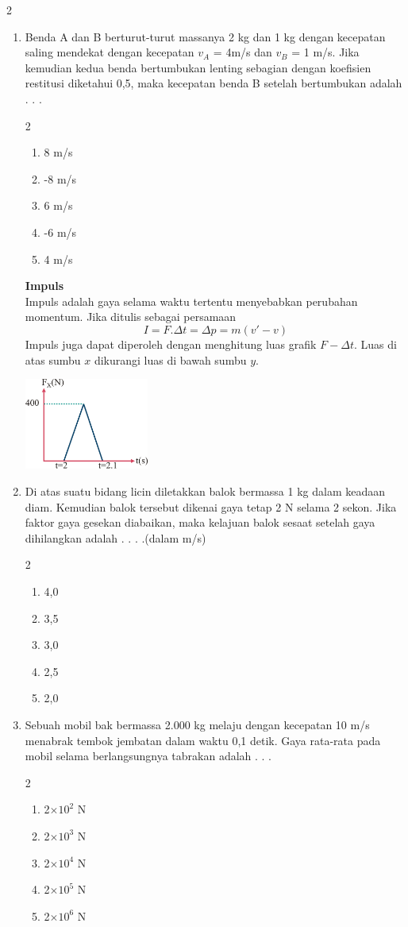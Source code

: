 \documentclass[10pt,a4paper]{extarticle}
\newcommand{\pilgani}[1]{                            \vspace{-0.3cm}\begin{multicols}{2}
 \begin{enumerate}[label=\Alph*., itemsep=0pt,topsep=0pt,leftmargin=*,align=Center]#1                     \end{enumerate}
 \phantom{ini cuma sapi, wedus, dan ayam}
 \end{multicols}}
\begin{document}
\begin{multicols*}{2}
\begin{enumerate}
\vspace{4cm}

\item Benda A dan B berturut-turut massanya 2 kg dan 1 kg dengan kecepatan saling mendekat dengan kecepatan $v_A$ = 4m/s dan $v_B$ = 1 m/s. Jika kemudian kedua benda bertumbukan lenting sebagian dengan koefisien restitusi diketahui 0,5, maka kecepatan benda B setelah bertumbukan adalah . . .
\pilgani{
        \item 8 m/s
        \item -8 m/s
        \item 6 m/s
        \item -6 m/s
        \item 4 m/s
        }
\vspace{4cm}




\textbf{ Impuls }\\
Impuls adalah gaya selama waktu tertentu menyebabkan perubahan momentum. Jika ditulis sebagai persamaan
$$ I = F.\Delta t = \Delta p = m(v'-v)$$
Impuls juga dapat diperoleh dengan menghitung luas grafik $F-\Delta t$. Luas di atas sumbu $x$ dikurangi luas di bawah sumbu $y$.
\begin{center}
\includegraphics[height=3cm]{pic/impuls}
\end{center}
\item Di atas suatu bidang licin diletakkan balok bermassa 1 kg dalam keadaan diam. Kemudian balok tersebut dikenai gaya tetap 2 N selama 2 sekon. Jika faktor gaya gesekan diabaikan, maka kelajuan balok sesaat setelah gaya dihilangkan adalah . . . .(dalam m/s)
\pilgani{
        \item 4,0
        \item 3,5
        \item 3,0
        \item 2,5
        \item 2,0}

\vspace{2cm}


\item Sebuah mobil bak bermassa 2.000 kg melaju dengan kecepatan 10 m/s menabrak tembok jembatan dalam waktu 0,1 detik. Gaya rata-rata pada mobil selama berlangsungnya tabrakan adalah . . .
\pilgani{
        \item 2$\times 10^2$ N
        \item 2$\times 10^3$ N
        \item 2$\times 10^4$ N
        \item 2$\times 10^5$ N
        \item 2$\times 10^6$ N
        }


\end{enumerate}
\end{multicols*}
\end{document}

